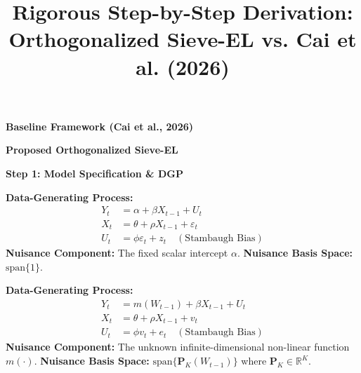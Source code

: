 \documentclass[11pt,landscape]{article}
\begin{document}
\title{\vspace{-1.5cm}Rigorous Step-by-Step Derivation: Orthogonalized Sieve-EL vs. Cai et al. (2026)}
\date{}
\maketitle

\vspace{-1.5cm}
\noindent\hrulefill

\vspace{0.5em}
\noindent
\begin{minipage}[t]{0.48\textwidth}
    \begin{center}
        \Large \textbf{Baseline Framework (Cai et al., 2026)}
    \end{center}
\end{minipage}%
\hfill
\begin{minipage}[t]{0.48\textwidth}
    \begin{center}
        \Large \textbf{Proposed Orthogonalized Sieve-EL}
    \end{center}
\end{minipage}

\vspace{0.5em}
\noindent\hrulefill
\vspace{1em}

\noindent\textbf{\large Step 1: Model Specification \& DGP} \vspace{0.5em}

\noindent
\begin{minipage}[t]{0.48\textwidth}
\textbf{Data-Generating Process:}
\begin{align}
    Y_t &= \alpha + \beta X_{t-1} + U_t \\
    X_t &= \theta + \rho X_{t-1} + \varepsilon_t \\
    U_t &= \phi \varepsilon_t + z_t \quad (\text{Stambaugh Bias})
\end{align}
\textbf{Nuisance Component:} The fixed scalar intercept $\alpha$. \newline
\textbf{Nuisance Basis Space:} $\text{span}\{1\}$.
\end{minipage}%
\hfill
\begin{minipage}[t]{0.48\textwidth}
\textbf{Data-Generating Process:}
\begin{align}
    Y_t &= m(W_{t-1}) + \beta X_{t-1} + U_t \\
    X_t &= \theta + \rho X_{t-1} + v_t \\
    U_t &= \phi v_t + e_t \quad (\text{Stambaugh Bias})
\end{align}
\textbf{Nuisance Component:} The unknown infinite-dimensional non-linear function $m(\cdot)$. \newline
\textbf{Nuisance Basis Space:} $\text{span}\{\bm{P}_K(W_{t-1})\}$ where $\bm{P}_K \in \mathbb{R}^K$.
\end{minipage}
\end{document}
